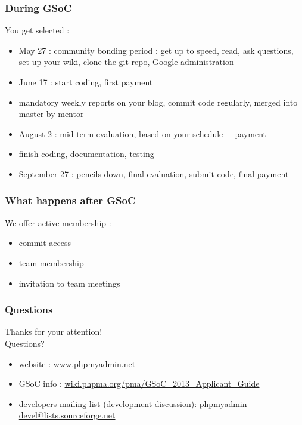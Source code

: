 \documentclass[14pt]{beamer}
\begin{document}
  \begin{frame}
    \frametitle{During GSoC}
    You get selected :
    \begin{itemize}
      \item May 27 : community bonding period : get up to speed, read, ask questions, set up your wiki, clone the git repo, Google administration
      \pause
      \item June 17 : start coding, first payment
      \item mandatory weekly reports on your blog, commit code regularly, merged into master by mentor
      \pause
      \item August 2 : mid-term evaluation, based on your schedule + payment
      \pause
      \item finish coding, documentation, testing
      \pause
      \item September 27 : pencils down, final evaluation, submit code, final payment
    \end{itemize}
  \end{frame}
  \begin{frame}
    \frametitle{What happens after GSoC}
    We offer active membership :
    \begin{itemize}
      \item commit access
      \item team membership
      \item invitation to team meetings
    \end{itemize}
  \end{frame}
  \begin{frame}
   \frametitle{Questions}
    Thanks for your attention!\\
    Questions?
    \begin{itemize}
      \item website : \href{http://www.phpmyadmin.net/}{www.phpmyadmin.net}
      \item GSoC info : \href{http://wiki.phpma.org/pma/GSoC\_2013\_Applicant\_Guide}{wiki.phpma.org/pma/GSoC\_2013\_Applicant\_Guide}
      \item developers mailing list (development discussion): \href{mailto:phpmyadmin-devel@lists.sourceforge.net}{phpmyadmin-devel@lists.sourceforge.net}
    \end{itemize}
  \end{frame}
\end{document}
